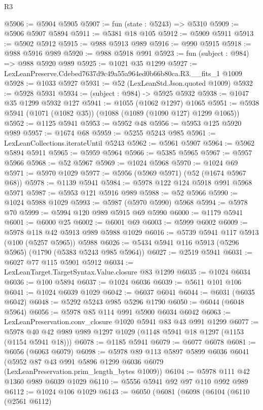 \begin{lexlean}{R3}
\begin{coremodule}
@5906 := @5904 @5905
@5907 := fun (state : @5243) => @5310
@5909 := @5906 @5907 @5894
@5911 := @5381 @18 @105
@5912 := @5909 @5911
@5913 := @5902 @5912
@5915 := @988 @5913 @989
@5916 := @990 @5915
@5918 := @988 @5916 @989
@5920 := @988 @5918 @991
@5923 := fun (subject : @984) => @988 @5920 @989
@5925 := @1021 @35 @1299
@5927 := LexLeanPreserve.Cdebed7637d9c49a55a964ed0b66b80ca.R3.__fits_1 @1009
@5928 := @1033 @5927
@5931 := @52 (LexLeanStd.Json.quoted @1009)
@5932 := @5928 @5931
@5934 := (subject : @984) -> @5925 @5932
@5938 := @1047 @35 @1299 @5932 @127
@5941 := @1055 (@1062 @1297) @1065
@5951 := @5938 @5941 (@1071 (@1082 @35)) (@1088 (@1089 (@1090 @127) @1299 @1065))
@5952 := @1125 @5941
@5953 := @5952 @48
@5956 := @5953 @125 @5920 @989
@5957 := @1674 @68
@5959 := @5255 @5243 @985
@5961 := LexLeanCollections.iterateUntil @5243
@5962 := @5961 @5907
@5964 := @5962 @5894 @5911
@5965 := @5959 @5964
@5966 := @5385 @5965
@5967 := @5957 @5966
@5968 := @52 @5967
@5969 := @1024 @5968
@5970 := @1024 @69
@5971 := @5970 @1029
@5977 := @5956 (@5969 @5971) (@52 (@1674 @5967 @68))
@5978 := @1139 @5941
@5984 := @5978 @122 @124 @5918 @991 @5968 @5971
@5987 := @5953 @121 @5916 @989
@5988 := @52 @5966
@5990 := @1024 @5988 @1029
@5993 := @5987 (@5970 @5990) @5968
@5994 := @5978 @70
@5999 := @5994 @120 @989 @5915 @69 @5990
@6000 := @1179 @5941
@6001 := @6000 @25
@6002 := @6001 @69
@6003 := @5999 @6002
@6009 := @5978 @118 @42 @5913 @989 @5988 @1029
@6016 := @5739 @5941 @117 @5913 (@100 (@5257 @5965)) @5988
@6026 := @5434 @5941 @116 @5913 (@5296 @5965) (@1790 (@5383 @5243 @985 @5964))
@6027 := @2519 @5941
@6031 := @6027 @77 @115 @5901 @5912
@6034 := LexLeanTarget.TargetSyntax.Value.closure @83 @1299
@6035 := @1024 @6034
@6036 := @100 @5894
@6037 := @1024 @6036
@6039 := @5611 @101 @106
@6041 := @1024 @6039 @1029
@6042 := @6037 @6041
@6044 := @6031 (@6035 @6042)
@6048 := @5292 @5243 @985 @5296 @1790
@6050 := @6044 (@6048 @5964)
@6056 := @5978 @85 @114 @991 @5900 @6034 @6042
@6063 := LexLeanPreservation.conv_closure @1020 @5941 @83 @43 @991 @1299
@6077 := @5978 @40 @42 @989 @989 @1297 @1029 (@1148 @5941 @18 @1297 (@1153 (@1154 @5941 @18)))
@6078 := @1185 @5941
@6079 := @6077 @6078
@6081 := @6056 (@6063 @6079)
@6098 := @5978
    @89
    @113
    @5897
    @5899
    @6036
    @6041
    (@5952 @87 @43 @991 @5896 @1299 @6036 @6079 (LexLeanPreservation.prim_length_bytes @1009))
@6104 := @5978 @111 @42 @1360 @989 @6039 @1029
@6110 := @5556 @5941 @92 @97 @110 @992 @989
@6112 := @1024 @106 @1029
@6143 := @6050
    (@6081
      (@6098
        (@6104
          (@6110
            (@2561 @6112)

\end{coremodule}
\end{lexlean}
